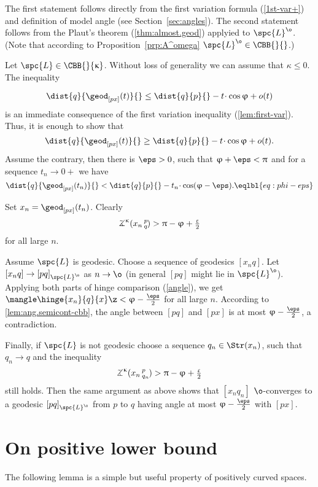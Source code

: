 The first statement follows directly from the first variation formula (\ref{1st-var+}) 
and definition of model angle (see Section~\ref{sec:angles}).
The second statement follows from the Plaut's theorem (\ref{thm:almost.geod}) applyied to $\spc{L}^\o$.
(Note that according to Proposition~\ref{prp:A^omega} $\spc{L}^\o\in\CBB{}{}$.)\qeds


Let $\spc{L}\in\CBB{}{\kappa}$. 
Without loss of generality we can assume that $\kappa\le 0$.
The inequality 

\[\dist{q}{\geod_{[p x]}(t)}{}
\le\dist{q}{p}{}-t\cdot\cos\phi+o(t)\]
is an immediate consequence of the first variation inequality (\ref{lem:first-var}).
Thus, it is enough to show that
\[\dist{q}{\geod_{[p x]}(t)}{}
\ge\dist{q}{p}{}-t\cdot\cos\phi+o(t).\]
Assume the contrary, then there is $\eps>0$, such that  $\phi+\eps<\pi$
and for a sequence $t_n\to 0+$ we have
\[\dist{q}{\geod_{[p x]}(t_n)}{}
<
\dist{q}{p}{}-t_n\cdot\cos(\phi-\eps).
\eqlbl{eq:phi-eps}\]

Set $x_n=\geod_{[p x]}(t_n)$.
Clearly 
\[\angk\kappa {x_n}p q>\pi-\phi+\tfrac\eps2\]
for all large $n$.

Assume $\spc{L}$ is geodesic. 
Choose a sequence of geodesics $[x_n q]$.
Let $[x_n q]\to [pq]_{\spc{L}^\o}$  as $n\to\o$ (in general $[pq]$ might lie in $\spc{L}^\o$).
Applying both parts of hinge comparison (\ref{angle}), 
we get $\mangle\hinge {x_n}{q}{x}\z<\phi-\tfrac\eps2$  for all large $n$.
According to \ref{lem:ang.semicont-cbb}, the angle between $[pq]$ and $[px]$ is at most $\phi-\tfrac\eps2$, a contradiction.


Finally, if $\spc{L}$ is not geodesic choose a sequence $q_n\in\Str(x_n)$, such that $q_n\to q$ and the inequality 
\[\angk\kappa{x_n}{p}{q_n}\z>\pi-\phi+\tfrac\eps2\] still holds.
Then the same argument as above shows that $[x_n q_n]$ $\o$-converges to a geodesic  $[pq]_{\spc{L}^\o}$ from $p$ to $q$  having angle at most $\phi-\tfrac{\eps}{2}$ with $[px]$.
\qeds




\section{On positive lower bound}\label{sec:positive.bound}
The following lemma is a simple but useful property of positively curved spaces.

